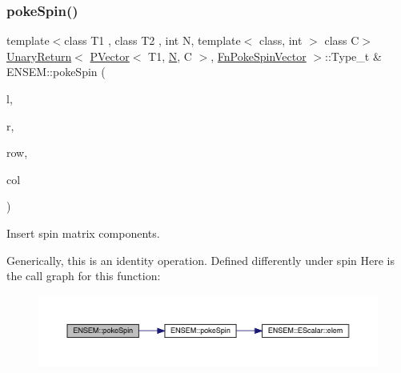 \subsubsection{\texorpdfstring{pokeSpin()}{pokeSpin()}\hspace{0.1cm}{\footnotesize\ttfamily [2/2]}}
{\footnotesize\ttfamily template$<$class T1 , class T2 , int N, template$<$ class, int $>$ class C$>$ \\
\mbox{\hyperlink{structENSEM_1_1UnaryReturn}{Unary\+Return}}$<$ \mbox{\hyperlink{classENSEM_1_1PVector}{P\+Vector}}$<$ T1, \mbox{\hyperlink{operator__name__util_8cc_a7722c8ecbb62d99aee7ce68b1752f337}{N}}, C $>$, \mbox{\hyperlink{structENSEM_1_1FnPokeSpinVector}{Fn\+Poke\+Spin\+Vector}} $>$\+::Type\+\_\+t \& E\+N\+S\+E\+M\+::poke\+Spin (\begin{DoxyParamCaption}\item[{\mbox{\hyperlink{classENSEM_1_1PVector}{P\+Vector}}$<$ T1, \mbox{\hyperlink{operator__name__util_8cc_a7722c8ecbb62d99aee7ce68b1752f337}{N}}, C $>$ \&}]{l,  }\item[{const \mbox{\hyperlink{classENSEM_1_1PVector}{P\+Vector}}$<$ T2, \mbox{\hyperlink{operator__name__util_8cc_a7722c8ecbb62d99aee7ce68b1752f337}{N}}, C $>$ \&}]{r,  }\item[{int}]{row,  }\item[{int}]{col }\end{DoxyParamCaption})\hspace{0.3cm}{\ttfamily [inline]}}



Insert spin matrix components. 

Generically, this is an identity operation. Defined differently under spin Here is the call graph for this function\+:\nopagebreak
\begin{figure}[H]
\begin{center}
\leavevmode
\includegraphics[width=350pt]{d3/dc4/group__primvector_ga89df0ab0f1f2a2f4374c848c2180493f_cgraph}
\end{center}
\end{figure}
\mbox{\label{group__primvector_ga7490c5f7d1484d1500da031d977a1217}} 
